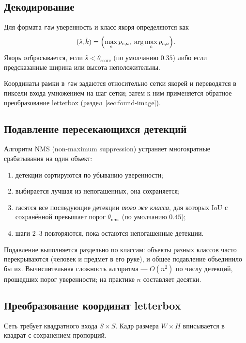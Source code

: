 \documentclass[11pt,a4paper]{article}
\theoremstyle{definition}
\theoremstyle{remark}
\begin{document}
\subsection{Декодирование}

Для формата \texttt{raw} уверенность и класс якоря определяются как
\[
  (\hat{s}, \hat{k}) = \Bigl(\max_{c} p_{c,a},\; \arg\max_{c} p_{c,a}\Bigr).
\]
Якорь отбрасывается, если $\hat{s} < \theta_{\text{score}}$ (по умолчанию
$0.35$) либо если предсказанные ширина или высота неположительны.

Координаты рамки в \texttt{raw} задаются относительно сетки якорей и
переводятся в пиксели входа умножением на шаг сетки; затем к ним применяется
обратное преобразование letterbox (раздел~\ref{sec:found-image}).

\subsection{Подавление пересекающихся детекций}

Алгоритм NMS (non-maximum suppression) устраняет многократные срабатывания на
один объект:

\begin{enumerate}
  \item детекции сортируются по убыванию уверенности;
  \item выбирается лучшая из непогашенных, она сохраняется;
  \item гасятся все последующие детекции \emph{того же класса}, для которых
        $\mathrm{IoU}$ с сохранённой превышает порог
        $\theta_{\text{nms}}$ (по умолчанию $0.45$);
  \item шаги 2--3 повторяются, пока остаются непогашенные детекции.
\end{enumerate}

Подавление выполняется раздельно по классам: объекты разных классов часто
перекрываются (человек и предмет в его руке), и общее подавление объединило
бы их. Вычислительная сложность алгоритма --- $O(n^2)$ по числу детекций,
прошедших порог уверенности; на практике $n$ составляет десятки.

\subsection{Преобразование координат letterbox}

Сеть требует квадратного входа $S \times S$. Кадр размера $W \times H$
вписывается в квадрат с сохранением пропорций.
\end{document}
